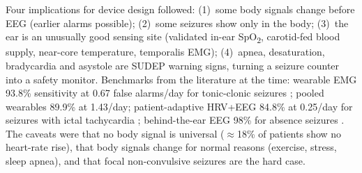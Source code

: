 Four implications for device design followed: (1)~some body signals change before EEG (earlier alarms possible); (2)~some seizures show only in the body; (3)~the ear is an unusually good sensing site (validated in-ear SpO\textsubscript{2}, carotid-fed blood supply, near-core temperature, temporalis EMG); (4)~apnea, desaturation, bradycardia and asystole are SUDEP warning signs, turning a seizure counter into a safety monitor. Benchmarks from the literature at the time: wearable EMG 93.8\% sensitivity at 0.67 false alarms/day for tonic-clonic seizures \cite{beniczky2018}; pooled wearables 89.9\% at 1.43/day; patient-adaptive HRV+EEG 84.8\% at 0.25/day for seizures with ictal tachycardia \cite{jeppesen2024}; behind-the-ear EEG 98\% for absence seizures \cite{swinnen2021}. The caveats were that no body signal is universal ($\approx$18\% of patients show no heart-rate rise), that body signals change for normal reasons (exercise, stress, sleep apnea), and that focal non-convulsive seizures are the hard case.
